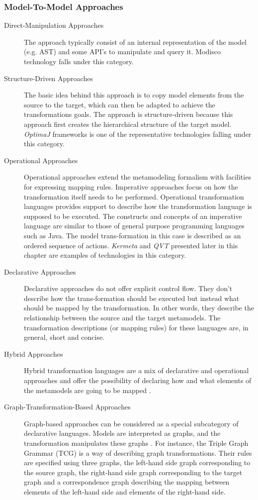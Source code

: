 \subsubsection{Model-To-Model Approaches}
\begin{description}
\item[Direct-Manipulation Approaches] The approach typically consist of an internal representation of the model (e.g. AST) and some API's to manipulate and query it. Modisco \cite{ModiscoMain} technology falls under this category.
\item[Structure-Driven Approaches]
The basic idea behind this approach is to copy model elements from the source to the target, which can  then be adapted to achieve the transformations goals. The approach is structure-driven because this approach first creates the hierarchical structure of the target model. \textit{OptimaJ} frameworks is one of the representative technologies falling under this category.
\item[Operational Approaches]
Operational approaches extend the metamodeling formalism with facilities for expressing mapping rules. 
Imperative approaches focus on how the transformation itself needs to be performed. Operational transformation languages provides support to describe how the transformation language is supposed to be executed. The constructs and concepts of an imperative language are similar to those of general purpose programming languages such as Java. The model trans-formation in this case is described as an ordered sequence of actions. \textit{Kermeta} and \textit{QVT} presented later in this chapter are examples of technologies in this category.
\item[Declarative Approaches]
Declarative approaches do not offer explicit control flow. They don't describe how the trans-formation should be executed but instead what should be mapped by the transformation. In other words, they describe the relationship between the source and the target metamodels. The transformation descriptions (or mapping rules) for these languages are, in general, short and concise. 
\item[Hybrid Approaches]
Hybrid transformation languages are a mix of declarative and operational approaches and offer the possibility of declaring how and what elements of the metamodels are going to be mapped \cite{HybridModelTransform}.
\item[Graph-Transformation-Based Approaches]
Graph-based approaches can be considered as a special subcategory of declarative languages. Models are interpreted as graphs, and the transformation manipulates these graphs \cite{GraphTransformations2006}. For instance, the Triple Graph Grammar (TCG) \cite{GraphTransformations2006} is a way of describing graph transformations. Their rules are specified using three graphs, the left-hand side graph corresponding to the source graph, the right-hand side graph corresponding to the target graph and a correspondence graph describing the mapping between elements of the left-hand side and elements of the right-hand side.

\end{description}

